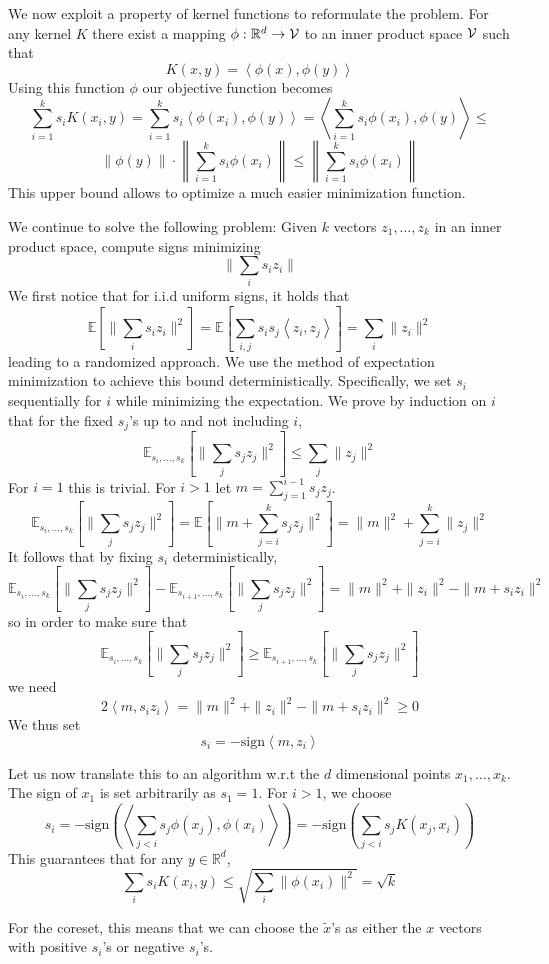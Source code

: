 \documentclass{article} %
\newcommand{\ip}[1]{\left \langle #1 \right \rangle}
\newcommand{\R}{\mathbb{R}}
\newcommand{\E}{\mathbb{E}}
\begin{document}
We now exploit a property of kernel functions to reformulate the problem. For any kernel $K$ there exist a mapping $\phi: \R^d \to {\cal V}$ to an inner product space $\cal V$ such that 
$$ K(x,y) = \ip{\phi(x), \phi(y)} $$
Using this function $\phi$ our objective function becomes
$$\sum_{i=1}^k s_i K(x_i,y) = \sum_{i=1}^k s_i \ip{\phi(x_i), \phi(y)} =  \ip{ \sum_{i=1}^k s_i \phi(x_i), \phi(y)} \leq $$
$$ \|\phi(y)\| \cdot \left\|  \sum_{i=1}^k s_i \phi(x_i) \right\| \leq  \left\|  \sum_{i=1}^k s_i \phi(x_i) \right\| $$
This upper bound allows to optimize a much easier minimization function. 

We continue to solve the following problem: Given $k$ vectors $z_1,\ldots,z_k$ in an inner product space, compute signs minimizing 
$$\| \sum_i s_i z_i \| $$
We first notice that for i.i.d uniform signs, it holds that
$$\E[\| \sum_i s_i z_i \|^2] = \E[\sum_{i,j} s_i s_j \ip{z_i, z_j}] = \sum_i \|z_i\|^2 $$
leading to a randomized approach. We use the method of expectation minimization to achieve this bound deterministically. Specifically, we set $s_i$ sequentially for $i$ while minimizing the expectation. We prove by induction on $i$ that for the fixed $s_j$'s up to and not including $i$,
$$\E_{s_i,\ldots,s_k}[\| \sum_j s_j z_j \|^2] \leq \sum_j \|z_j\|^2$$
For $i=1$ this is trivial. For $i>1$ let $m=\sum_{j=1}^{i-1} s_j z_j$.
$$ \E_{s_i,\ldots,s_k}[\| \sum_j s_j z_j \|^2] = \E[\| m + \sum_{j=i}^k s_j z_j \|^2] = \|m\|^2 + \sum_{j=i}^k \|z_j\|^2$$
It follows that by fixing $s_i$ deterministically,
$$ \E_{s_i,\ldots,s_k}[\| \sum_j s_j z_j \|^2] - \E_{s_{i+1},\ldots,s_k}[\| \sum_j s_j z_j \|^2] = \|m\|^2 + \|z_i\|^2 - \|m + s_i z_i\|^2  $$
so in order to make sure that 
$$ \E_{s_i,\ldots,s_k}[\| \sum_j s_j z_j \|^2] \geq \E_{s_{i+1},\ldots,s_k}[\| \sum_j s_j z_j \|^2] $$
we need
$$ 2\ip{m,s_i z_i} = \|m\|^2 + \|z_i\|^2 - \|m + s_i z_i\|^2 \geq 0 $$
We thus set 
$$ s_i = -\text{sign} \ip{m,z_i}$$

Let us now translate this to an algorithm w.r.t the $d$ dimensional points $x_1,\ldots, x_k$. The sign of $x_1$ is set arbitrarily as $s_1=1$. For $i>1$, we choose 
$$ s_i = -\text{sign} \left( \ip{\sum_{j<i} s_j \phi(x_j), \phi(x_i)} \right) = -\text{sign} \left( \sum_{j<i} s_j K(x_j, x_i) \right) $$
This guarantees that for any $y \in \R^d$,
$$ \sum_i s_i K(x_i, y) \leq \sqrt{ \sum_i \|\phi(x_i)\|^2 } = \sqrt{k} $$

For the coreset, this means that we can choose the $\tilde{x}$'s as either the $x$ vectors with positive $s_i$'s or negative $s_i$'s.
\end{document}
